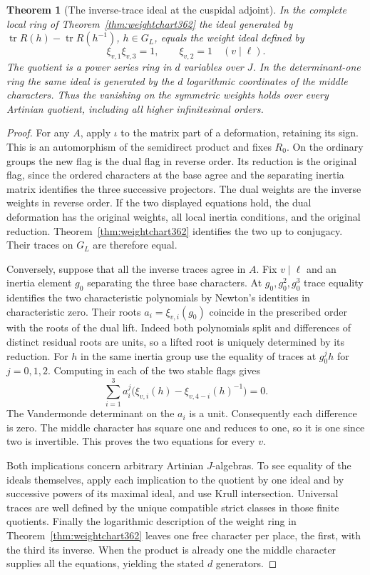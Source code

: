 \documentclass[a4paper,11pt]{article}
\newtheorem{theorem}[proposition]{Theorem}
\theoremstyle{definition}
\theoremstyle{remark}
\numberwithin{equation}{section}
\begin{document}
\begin{theorem}[The inverse-trace ideal at the cuspidal adjoint]\label{thm:traceideal362}
In the complete local ring of Theorem~\ref{thm:weightchart362}
the ideal generated by
\(\operatorname{tr}R(h)-\operatorname{tr}R(h^{-1})\),
\(h\in G_L\), equals the weight ideal defined by
\[
       \xi_{v,1}\xi_{v,3}=1,\qquad \xi_{v,2}=1
                  \quad(v\mid\ell).
\]
The quotient is a power series ring in \(d\) variables over
\(J\). In the determinant-one ring the same ideal is generated
by the \(d\) logarithmic coordinates of the middle characters.
Thus the vanishing on the symmetric weights holds over every
Artinian quotient, including all higher infinitesimal orders.
\end{theorem}
\begin{proof}
For any \(A\), apply \(\iota\) to the matrix part of a
deformation, retaining its sign. This is an automorphism of
the semidirect product and fixes \(R_0\). On the ordinary
groups the new flag is the dual flag in reverse order. Its
reduction is the original flag, since the ordered characters
at the base agree and the separating inertia matrix identifies
the three successive projectors. The dual weights are the
inverse weights in reverse order. If the two displayed equations
hold, the dual deformation has the original weights, all local
inertia conditions, and the original reduction.
Theorem~\ref{thm:weightchart362} identifies the two up to
conjugacy. Their traces on \(G_L\) are therefore equal.

Conversely, suppose that all the inverse traces agree in \(A\).
Fix \(v\mid\ell\) and an inertia element \(g_0\) separating
the three base characters. At \(g_0,g_0^2,g_0^3\) trace
equality identifies the two characteristic polynomials by
Newton's identities in characteristic zero. Their roots
\(a_i=\xi_{v,i}(g_0)\) coincide in the prescribed order with
the roots of the dual lift. Indeed both polynomials split
and differences of distinct residual roots are units, so
a lifted root is uniquely determined by its reduction.
For \(h\) in the same inertia group use the equality of traces
at \(g_0^j h\) for \(j=0,1,2\). Computing in each of the two
stable flags gives
\[
       \sum_{i=1}^3 a_i^j
       \bigl(\xi_{v,i}(h)-\xi_{v,4-i}(h)^{-1}\bigr)=0 .
\]
The Vandermonde determinant on the \(a_i\) is a unit.
Consequently each difference is zero. The middle character
has square one and reduces to one, so it is one since two is
invertible. This proves the two equations for every \(v\).

Both implications concern arbitrary Artinian \(J\)-algebras.
To see equality of the ideals themselves, apply each implication
to the quotient by one ideal and by successive powers of its
maximal ideal, and use Krull intersection. Universal traces are
well defined by the unique compatible strict classes in those
finite quotients. Finally the logarithmic description of the
weight ring in Theorem~\ref{thm:weightchart362} leaves one free
character per place, the first, with the third its inverse.
When the product is already one the middle character supplies
all the equations, yielding the stated \(d\) generators.
\end{proof}
\end{document}
